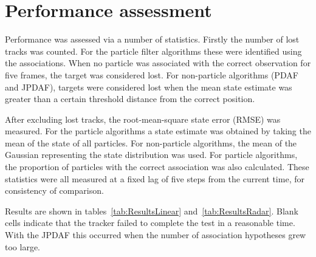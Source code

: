 \section{Performance assessment}
Performance was assessed via a number of statistics. Firstly the number of lost tracks was counted. For the particle filter algorithms these were identified using the associations. When no particle was associated with the correct observation for five frames, the target was considered lost. For non-particle algorithms (PDAF and JPDAF), targets were considered lost when the mean state estimate was greater than a certain threshold distance from the correct position.

After excluding lost tracks, the root-mean-square state error (RMSE) was measured. For the particle algorithms a state estimate was obtained by taking the mean of the state of all particles. For non-particle algorithms, the mean of the Gaussian representing the state distribution was used. For particle algorithms, the proportion of particles with the correct association was also calculated. These statistics were all measured at a fixed lag of five steps from the current time, for consistency of comparison.

Results are shown in tables~\ref{tab:ResultsLinear} and~\ref{tab:ResultsRadar}. Blank cells indicate that the tracker failed to complete the test in a reasonable time. With the JPDAF this occurred when the number of association hypotheses grew too large.

